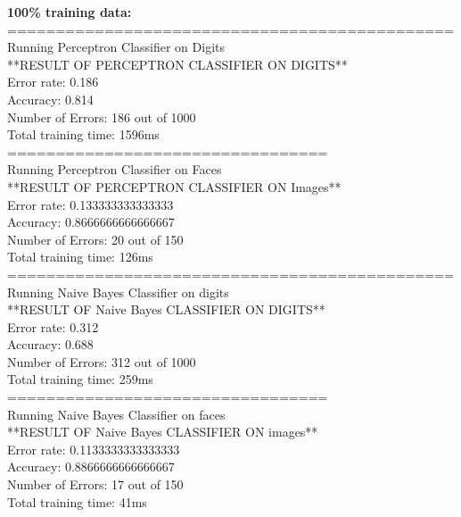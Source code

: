 \documentclass{article}
\begin{document}
        
        \textbf{100\% training data: }\\
        ==============================================\\
        Running Perceptron Classifier on Digits\\
        **RESULT OF PERCEPTRON CLASSIFIER ON DIGITS**\\
        Error rate: 0.186 \\
        Accuracy: 0.814\\
        Number of Errors: 186 out of 1000\\
        Total training time: 1596ms\\
        =================================\\
        Running Perceptron Classifier on Faces\\
        **RESULT OF PERCEPTRON CLASSIFIER ON Images**\\
        Error rate: 0.133333333333333 \\
        Accuracy: 0.8666666666666667\\
        Number of Errors: 20 out of 150\\
        Total training time: 126ms\\
        
        ==============================================\\
        Running Naive Bayes Classifier on digits\\
        **RESULT OF Naive Bayes CLASSIFIER ON DIGITS**\\
        Error rate: 0.312 \\
        Accuracy: 0.688\\
        Number of Errors: 312 out of 1000\\
        Total training time: 259ms\\
        =================================\\
        Running Naive Bayes Classifier on faces\\
        **RESULT OF Naive Bayes CLASSIFIER ON images**\\
        Error rate: 0.1133333333333333 \\
        Accuracy: 0.8866666666666667\\
        Number of Errors: 17 out of 150\\
        Total training time: 41ms\\
        
\end{document}
